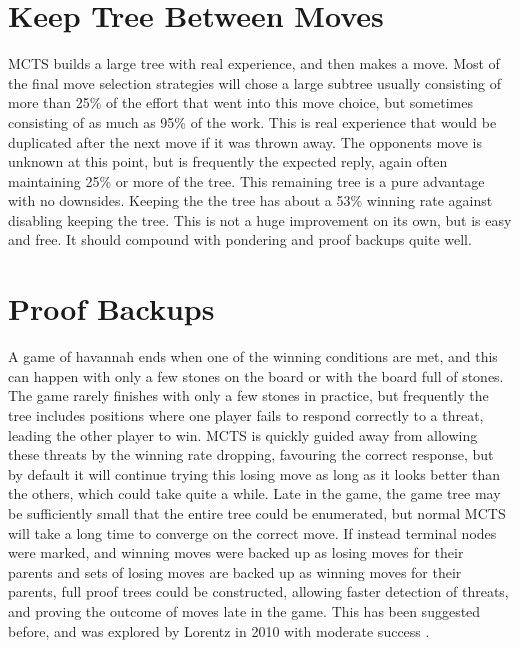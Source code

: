 \section{Keep Tree Between Moves}

MCTS builds a large tree with real experience, and then makes a move. Most of the final move selection strategies will chose a large subtree usually consisting of more than 25\% of the effort that went into this move choice, but sometimes consisting of as much as 95\% of the work. This is real experience that would be duplicated after the next move if it was thrown away. The opponents move is unknown at this point, but is frequently the expected reply, again often maintaining 25\% or more of the tree. This remaining tree is a pure advantage with no downsides. Keeping the the tree has about a 53\% winning rate against disabling keeping the tree. This is not a huge improvement on its own, but is easy and free. It should compound with pondering and proof backups quite well.



\section{Proof Backups}\label{sec:proofbackups}

A game of havannah ends when one of the winning conditions are met, and this can happen with only a few stones on the board or with the board full of stones. The game rarely finishes with only a few stones in practice, but frequently the tree includes positions where one player fails to respond correctly to a threat, leading the other player to win. MCTS is quickly guided away from allowing these threats by the winning rate dropping, favouring the correct response, but by default it will continue trying this losing move as long as it looks better than the others, which could take quite a while. Late in the game, the game tree may be sufficiently small that the entire tree could be enumerated, but normal MCTS will take a long time to converge on the correct move. If instead terminal nodes were marked, and winning moves were backed up as losing moves for their parents and sets of losing moves are backed up as winning moves for their parents, full proof trees could be constructed, allowing faster detection of threats, and proving the outcome of moves late in the game. This has been suggested before, and was explored by Lorentz in 2010 with moderate success \cite{lorentz2011improving}.


